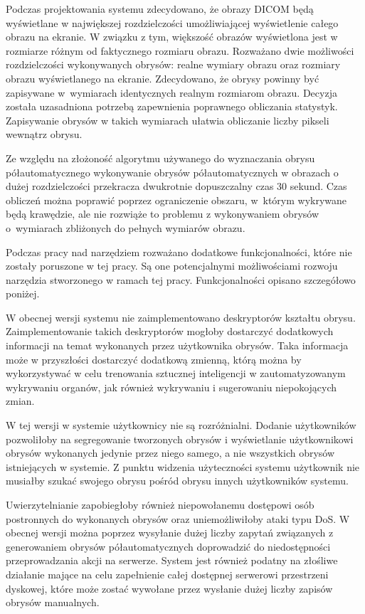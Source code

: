 \documentclass[a4paper,11pt,twoside,openright]{report}
\theoremstyle{definition}
\begin{document}
Podczas projektowania systemu zdecydowano, że obrazy DICOM będą wyświetlane w
największej rozdzielczości umożliwiającej wyświetlenie całego obrazu na ekranie.
W związku z tym, większość obrazów wyświetlona jest w rozmiarze różnym od
faktycznego rozmiaru obrazu. Rozważano dwie możliwości rozdzielczości wykonywanych
obrysów: realne wymiary obrazu oraz rozmiary obrazu wyświetlanego na ekranie.
Zdecydowano, że obrysy powinny być zapisywane w~wymiarach identycznych realnym
rozmiarom obrazu. Decyzja została uzasadniona potrzebą zapewnienia poprawnego
obliczania statystyk. Zapisywanie obrysów w takich wymiarach ułatwia obliczanie
liczby pikseli wewnątrz obrysu.

Ze względu na złożoność algorytmu używanego do wyznaczania obrysu półautomatycznego
wykonywanie obrysów półautomatycznych w obrazach o dużej rozdzielczości przekracza
dwukrotnie dopuszczalny czas 30 sekund. Czas
obliczeń można poprawić poprzez ograniczenie obszaru, w~którym wykrywane będą
krawędzie, ale nie rozwiąże to problemu z wykonywaniem obrysów o~wymiarach
zbliżonych do pełnych wymiarów obrazu.

Podczas pracy nad narzędziem rozważano dodatkowe funkcjonalności, które nie zostały
poruszone w tej pracy. Są one potencjalnymi możliwościami rozwoju narzędzia
stworzonego w ramach tej pracy. Funkcjonalności opisano szczegółowo poniżej.

W obecnej wersji systemu nie zaimplementowano deskryptorów kształtu obrysu.
Zaimplementowanie takich deskryptorów mogłoby dostarczyć dodatkowych informacji
na temat wykonanych przez użytkownika obrysów. Taka informacja może w przyszłości
dostarczyć dodatkową zmienną, którą można by wykorzystywać w celu trenowania
sztucznej inteligencji w zautomatyzowanym wykrywaniu organów, jak również wykrywaniu
i sugerowaniu niepokojących zmian.

W tej wersji w systemie użytkownicy nie są rozróżnialni. Dodanie użytkowników
pozwoliłoby na segregowanie tworzonych obrysów i wyświetlanie użytkownikowi
obrysów wykonanych jedynie przez niego samego, a nie wszystkich obrysów istniejących
w systemie. Z punktu widzenia użyteczności systemu użytkownik nie musiałby szukać
swojego obrysu pośród obrysu innych użytkowników systemu.

Uwierzytelnianie zapobiegłoby również niepowołanemu dostępowi osób postronnych
do wykonanych obrysów oraz uniemożliwiłoby ataki typu DoS. W obecnej wersji można
poprzez wysyłanie dużej liczby zapytań związanych z generowaniem obrysów półautomatycznych
doprowadzić do niedostępności przeprowadzania akcji na serwerze. System jest również
podatny na złośliwe działanie mające na celu zapełnienie całej dostępnej serwerowi
przestrzeni dyskowej, które może zostać wywołane przez wysłanie dużej liczby
zapisów obrysów manualnych.
\end{document}
